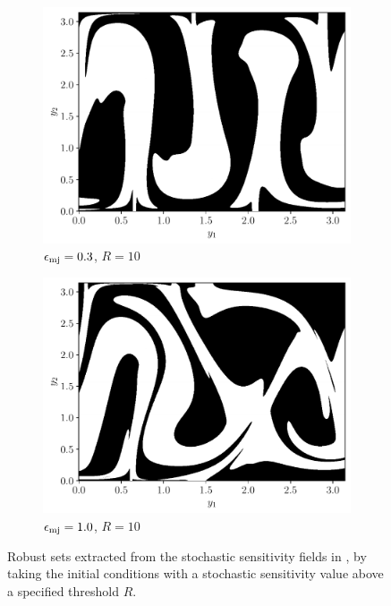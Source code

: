 \begin{figure}
	\begin{center}
		\begin{subfigure}{0.49\textwidth}
			\includegraphics[width=\textwidth]{chp04_paper_numerics/figures/rossby/S2_robust_0.3.pdf}
			\caption{\(\epsilon_{\mathrm{mj}} = 0.3\), \(R = 10\)}
		\end{subfigure}
		\begin{subfigure}{0.49\textwidth}
			\includegraphics[width=\textwidth]{chp04_paper_numerics/figures/rossby/S2_robust_1.0.pdf}
			\caption{\(\epsilon_{\mathrm{mj}} = 1.0\), \(R = 10\)}
		\end{subfigure}
		\caption{Robust sets extracted from the stochastic sensitivity fields in , by taking the initial conditions with a stochastic sensitivity value above a specified threshold \(R\). }
		\label{fig:ex_jet_robust}
	\end{center}
\end{figure}



